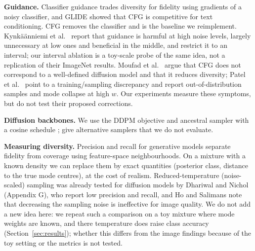 \textbf{Guidance.} Classifier guidance \cite{dhariwal2021diffusion} trades diversity for fidelity using gradients of a noisy classifier, and GLIDE \cite{nichol2021glide} showed that CFG is competitive for text conditioning. CFG \cite{ho2022classifier} removes the classifier and is the baseline we reimplement. Kynk\"a\"anniemi et al.~\cite{kynknniemi2024applying} report that guidance is harmful at high noise levels, largely unnecessary at low ones and beneficial in the middle, and restrict it to an interval; our interval ablation is a toy-scale probe of the same idea, not a replication of their ImageNet results. Moufad et al.~\cite{moufad2025conditional} argue that CFG does not correspond to a well-defined diffusion model and that it reduces diversity; Patel et al.~\cite{patel2023bridging} point to a training/sampling discrepancy and report out-of-distribution samples and mode collapse at high $w$. Our experiments measure these symptoms, but do not test their proposed corrections.

\textbf{Diffusion backbones.} We use the DDPM objective and ancestral sampler \cite{ho2020denoising} with a cosine schedule \cite{nichol2021improved}; \cite{song2020denoising,karras2022elucidating} give alternative samplers that we do not evaluate.

\textbf{Measuring diversity.} Precision and recall for generative models \cite{sajjadi2018assessing,kynknniemi2019improved} separate fidelity from coverage using feature-space neighbourhoods. On a mixture with a known density we can replace them by exact quantities (posterior class, distance to the true mode centres), at the cost of realism. Reduced-temperature (noise-scaled) sampling was already tested for diffusion models by Dhariwal and Nichol \cite{dhariwal2021diffusion} (Appendix G), who report low precision and recall, and Ho and Salimans \cite{ho2022classifier} note that decreasing the sampling noise is ineffective for image quality. We do not add a new idea here: we repeat such a comparison on a toy mixture where mode weights are known, and there temperature does raise class accuracy (Section~\ref{sec:results}); whether this differs from the image findings because of the toy setting or the metrics is not tested.
